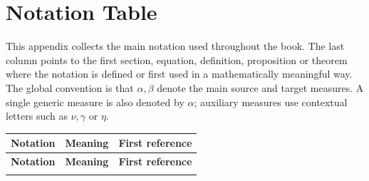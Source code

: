 
\chapter{Notation Table}
\label{app-notation-table}

This appendix collects the main notation used throughout the book. The last
column points to the first section, equation, definition, proposition or theorem
where the notation is defined or first used in a mathematically meaningful way.
The global convention is that $\alpha,\beta$ denote the main source and target
measures. A single generic measure is also denoted by $\alpha$;
auxiliary measures use contextual letters such as $\nu,\gamma$ or $\eta$.

{\small
\setlength{\tabcolsep}{4pt}
\renewcommand{\arraystretch}{1.16}
\begin{longtable}{>{\raggedright\arraybackslash}p{}
                  >{\raggedright\arraybackslash}p{}
                  >{\raggedright\arraybackslash}p{}}
\hline
\textbf{Notation} & \textbf{Meaning} & \textbf{First reference} \\
\hline
\endfirsthead
\hline
\textbf{Notation} & \textbf{Meaning} & \textbf{First reference} \\
\hline
\endhead
\hline
\endfoot


\end{longtable}}
